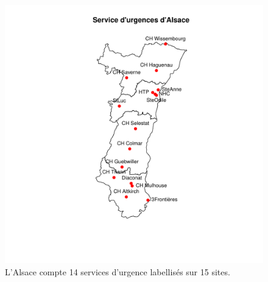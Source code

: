\documentclass[12pt,english,french,twoside]{book}\usepackage[]{graphicx}\usepackage[]{color}
\makeatletter
\def\maxwidth{ %
  \ifdim\Gin@nat@width>\linewidth
    \linewidth
  \else
    \Gin@nat@width
  \fi
}
\newenvironment{knitrout}{}{} %
\makeatother
\begin{document}
\begin{figure}[ht]
 \centering
\begin{knitrout}
\color{fgcolor}
\includegraphics[width=\maxwidth]{figure/carte_sau_2} 

\end{knitrout}

 \caption[Services d'urgence d'Alsace]{L’Alsace compte 14 services d'urgence labellisés sur 15 sites.}
 \label{fig:su_alsace}
\end{figure}
\end{document}
